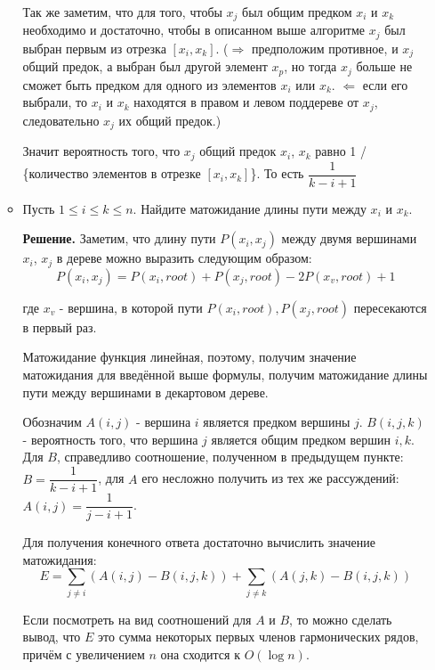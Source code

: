 \begin{enumerate}
\begin{itemize}
		Так же заметим, что для того, чтобы $x_j$ был общим предком $x_i$ и $x_k$ необходимо и достаточно, чтобы 
		в описанном выше алгоритме $x_j$ был выбран первым из отрезка $[x_i, x_k]$. ($\Rightarrow$ предположим 
		противное, и $x_j$ общий предок, а выбран был другой элемент $x_p$, но тогда $x_j$ больше не сможет быть 
		предком для одного из элементов $x_i$ или $x_k$. $\Leftarrow$ если его выбрали, то $x_i$ и $x_k$ 
		находятся в правом и левом поддереве от $x_j$, следовательно $x_j$ их общий предок.)
		
		Значит вероятность того, что $x_j$ общий предок $x_i$, $x_k$ равно 1 / \{количество элементов в отрезке 
		$[x_i, x_k]$\}. То есть $\dfrac{1}{k - i + 1}$
		
		\item Пусть $1 \leqslant i \leqslant k \leqslant n$. Найдите матожидание длины пути между $x_i$ и $x_k$.
		
		\textbf{Решение.} Заметим, что длину пути $P(x_i, x_j)$ между двумя вершинами $x_i$, $x_j$ в дереве можно 
		выразить следующим образом:
		\begin{equation*}
		P(x_i, x_j) = P(x_i, root) + P(x_j, root) - 2P(x_v, root) + 1
		\end{equation*}
		
		где $x_v$ - вершина, в которой пути $P(x_i, root), P(x_j, root)$ пересекаются в первый раз.
		
		Матожидание функция линейная, поэтому, получим значение матожидания для введённой выше формулы, получим 
		матожидание длины пути между вершинами в декартовом дереве.
		
		Обозначим $A(i, j)$ - вершина $i$ является предком вершины $j$. $B(i, j, k)$ - вероятность того, что 
		вершина $j$ является общим предком вершин $i, k$. Для $B$, справедливо соотношение, полученном в 
		предыдущем пункте: $B = \dfrac{1}{k - i + 1}$, для $A$ его несложно получить из тех же рассуждений: $A(i, 
		j) = \dfrac{1}{j - i + 1}$.
		
		Для получения конечного ответа достаточно вычислить значение матожидания:
		\begin{equation*}
		E = \sum\limits_{j\neq i}(A(i, j) - B(i, j, k)) + \sum\limits_{j \neq k}(A(j, k) - B(i, j, k))
		\end{equation*}
		
		Если посмотреть на вид соотношений для $A$ и $B$, то можно сделать вывод, что $E$ это сумма некоторых 
		первых членов гармонических рядов, причём с увеличением $n$ она сходится к $O(\log n)$.	
	\end{itemize}
	

\end{enumerate}
